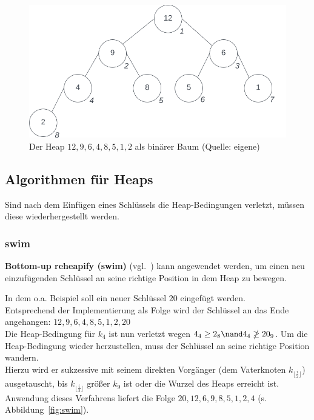 \begin{figure}
    \begin{center}
        \includegraphics[scale=0.4]{chapters/Datenstrukturen und Algorithmen/img/heaptree}
        \caption{Der Heap  $12, 9, 6, 4, 8, 5, 1, 2$ als binärer Baum (Quelle: eigene)}
        \label{fig:heaptree}
    \end{center}
\end{figure}


\subsection{Algorithmen für Heaps}
Sind nach dem Einfügen eines Schlüssels die Heap-Bedingungen verletzt, müssen diese wiederhergestellt werden.

\subsubsection{swim}

\textbf{Bottom-up reheapify (swim)} (vgl.~\cite[315]{SW11}) kann angewendet werden, um einen neu einzufügenden Schlüssel an seine richtige Position in dem Heap zu bewegen.

\noindent
In dem o.a. Beispiel soll ein neuer Schlüssel $20$ eingefügt werden.\\
Entsprechend der Implementierung als Folge wird der Schlüssel an das Ende angehangen: $12, 9, 6, 4, 8, 5, 1, 2, 20$\\

\noindent
Die Heap-Bedingung für $k_4$ ist nun verletzt wegen $4_4 \geq 2_8 \nand 4_4 \ngeq 20_9$.
Um die Heap-Bedingung wieder herzustellen, muss der Schlüssel an seine richtige Position wandern.\\
Hierzu wird er sukzessive mit seinem direkten Vorgänger (dem Vaterknoten $k_{\lfloor \frac{i}{2} \rfloor}$) ausgetauscht, bis $k_{\lfloor \frac{i}{2} \rfloor}$ größer $k_9$ ist oder die Wurzel des Heaps erreicht ist.\\
Anwendung dieses Verfahrens liefert die Folge $20, 12, 6, 9, 8, 5, 1, 2, 4$  (s. Abbildung~\ref{fig:swim}).

